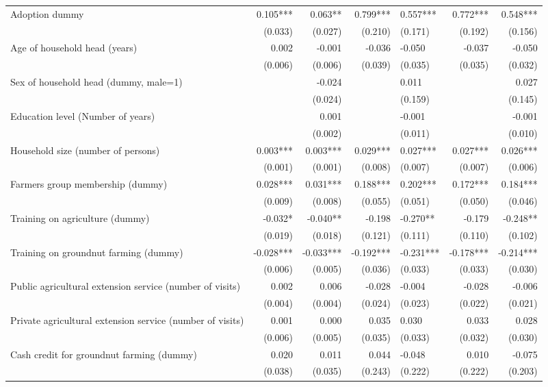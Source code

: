 \documentclass[
]{article}
\begin{document}
\begin{landscape}
\begin{longtable}[t]{lrrrlrr}
\endfoot
\bottomrule
\endlastfoot
Adoption dummy & 0.105*** & 0.063** & 0.799*** & 0.557*** & 0.772*** & 0.548***\\
 & (0.033) & (0.027) & (0.210) & (0.171) & (0.192) & (0.156)\\
Age of household head (years) & 0.002 & -0.001 & -0.036 & -0.050 & -0.037 & -0.050\\
 & (0.006) & (0.006) & (0.039) & (0.035) & (0.035) & (0.032)\\
Sex of household head (dummy, male=1) &  & -0.024 &  & 0.011 &  & 0.027\\
 &  & (0.024) &  & (0.159) &  & (0.145)\\
Education level (Number of years) &  & 0.001 &  & -0.001 &  & -0.001\\
 &  & (0.002) &  & (0.011) &  & (0.010)\\
Household size (number of persons) & 0.003*** & 0.003*** & 0.029*** & 0.027*** & 0.027*** & 0.026***\\
 & (0.001) & (0.001) & (0.008) & (0.007) & (0.007) & (0.006)\\
Farmers group membership (dummy) & 0.028*** & 0.031*** & 0.188*** & 0.202*** & 0.172*** & 0.184***\\
 & (0.009) & (0.008) & (0.055) & (0.051) & (0.050) & (0.046)\\
Training on agriculture (dummy) & -0.032* & -0.040** & -0.198 & -0.270** & -0.179 & -0.248**\\
 & (0.019) & (0.018) & (0.121) & (0.111) & (0.110) & (0.102)\\
Training on groundnut farming (dummy) & -0.028*** & -0.033*** & -0.192*** & -0.231*** & -0.178*** & -0.214***\\
 & (0.006) & (0.005) & (0.036) & (0.033) & (0.033) & (0.030)\\
Public agricultural extension service (number of visits) & 0.002 & 0.006 & -0.028 & -0.004 & -0.028 & -0.006\\
 & (0.004) & (0.004) & (0.024) & (0.023) & (0.022) & (0.021)\\
Private agricultural extension service (number of visits) & 0.001 & 0.000 & 0.035 & 0.030 & 0.033 & 0.028\\
 & (0.006) & (0.005) & (0.035) & (0.033) & (0.032) & (0.030)\\
Cash credit for groundnut farming (dummy) & 0.020 & 0.011 & 0.044 & -0.048 & 0.010 & -0.075\\
 & (0.038) & (0.035) & (0.243) & (0.222) & (0.222) & (0.203)\\

\end{longtable}
\end{landscape}
\end{document}
